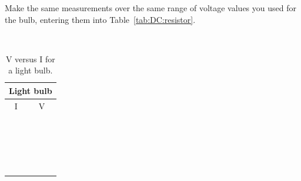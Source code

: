 \pagebreak
\noindent Make the same measurements 
over the same range of voltage values you used for the bulb, entering
them into Table~\ref{tab:DC:resistor}.

\ \\
\vspace*{1cm}
\begin{table}[htb]
\begin{center}
\begin{tabular}{|c|c|}
\hline
\multicolumn{2}{|c|}{Light bulb}\\
\hline
I & V \\
\hline
\hspace*{5cm} & \hspace*{5cm} \\
& \\
\hline
& \\
& \\
\hline
& \\
& \\
\hline
& \\
& \\
\hline
& \\
& \\
\hline
& \\
& \\
\hline
& \\
& \\
\hline
& \\
& \\
\hline
& \\
& \\
\hline
& \\
& \\
\hline
\end{tabular}
\end{center}
\caption{V versus I for a light bulb.}
\label{tab:DC:lightbulb}
\end{table}

\pagebreak

